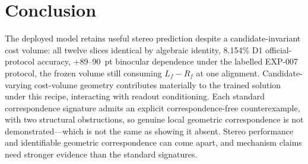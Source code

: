 \documentclass[conference]{IEEEtran}
\begin{document}
\section{Conclusion}
\label{sec:conclusion}

The deployed model retains useful stereo prediction despite a candidate-invariant cost volume: all twelve slices identical by algebraic identity, 8.154\% D1 official-protocol accuracy, +89--90~pt binocular dependence under the labelled EXP-007 protocol, the frozen volume still consuming $L_f - R_f$ at one alignment. Candidate-varying cost-volume geometry contributes materially to the trained solution under this recipe, interacting with readout conditioning. Each standard correspondence signature admits an explicit correspondence-free counterexample, with two structural obstructions, so genuine local geometric correspondence is not demonstrated---which is not the same as showing it absent. Stereo performance and identifiable geometric correspondence can come apart, and mechanism claims need stronger evidence than the standard signatures.



\end{document}

